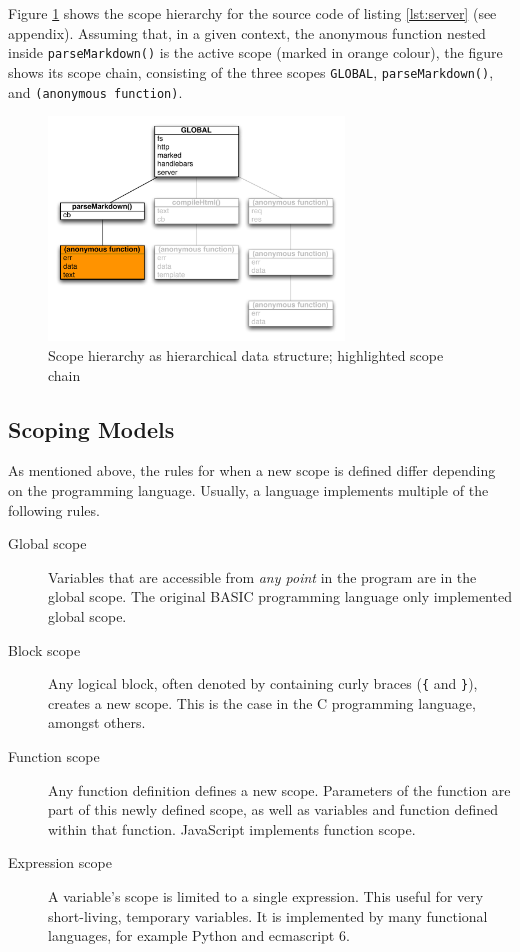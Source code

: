 Figure \ref{fig:scopechain} shows the scope hierarchy for the source
code of listing \ref{lst:server} (see appendix). Assuming that, in a
given context, the anonymous function nested inside
\texttt{parseMarkdown()} is the active scope (marked in orange colour),
the figure shows its scope chain, consisting of the three scopes
\texttt{GLOBAL}, \texttt{parseMarkdown()}, and
\texttt{(anonymous function)}.

\begin{figure}[htbp]
\centering
\includegraphics[keepaspectratio,width=0.7\textwidth]{img/scopechain.pdf}
\caption{Scope hierarchy as hierarchical data structure; highlighted scope chain}
\label{fig:scopechain}
\end{figure}

\subsection{Scoping Models}\label{scoping-models}

As mentioned above, the rules for when a new scope is defined differ
depending on the programming language. Usually, a language implements
multiple of the following rules.

\begin{description}
\item[Global scope]
Variables that are accessible from \emph{any point} in the program are
in the global scope. The original BASIC programming language only
implemented global scope.
\item[Block scope]
Any logical block, often denoted by containing curly braces (\texttt{\{}
and \texttt{\}}), creates a new scope. This is the case in the C
programming language, amongst others.
\item[Function scope]
Any function definition defines a new scope. Parameters of the function
are part of this newly defined scope, as well as variables and function
defined within that function. JavaScript implements function scope.
\item[Expression scope]
A variable’s scope is limited to a single expression. This useful for
very short-living, temporary variables. It is implemented by many
functional languages, for example Python and \gls{ecmascript} 6.
\end{description}

